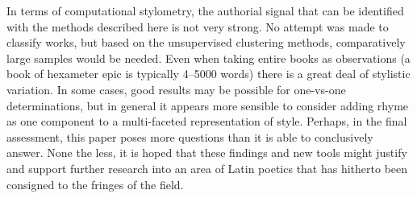 \documentclass[twocolumn, switch, a4paper]{article} %
\begin{document}
In terms of computational stylometry, the authorial signal that can be
identified with the methods described here is not very strong. No attempt was
made to classify works, but based on the unsupervised clustering methods,
comparatively large samples would be needed. Even when taking entire books as
observations (a book of hexameter epic is typically 4--5000 words) there is a
great deal of stylistic variation. In some cases, good results may be possible
for one-vs-one determinations, but in general it appears more sensible to
consider adding rhyme as one component to a multi-faceted representation of
style. Perhaps, in the final assessment, this paper poses more questions than
it is able to conclusively answer. None the less, it is hoped that these
findings and new tools might justify and support further research into
an area of Latin poetics that has hitherto been consigned to the fringes of
the field.




\normalsize



\end{document}
